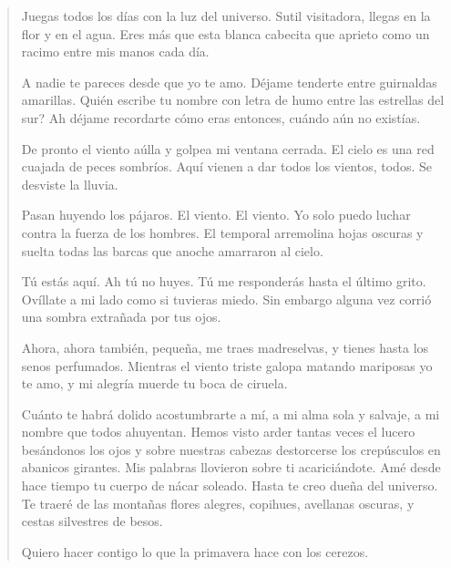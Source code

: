 \documentclass[12pt]{article}
\begin{document}
\clearpage
{}
\begin{verse}
Juegas todos los días con la luz del universo.  
Sutil visitadora, llegas en la flor y en el agua.  
Eres más que esta blanca cabecita que aprieto  
como un racimo entre mis manos cada día.  
	
A nadie te pareces desde que yo te amo.  
Déjame tenderte entre guirnaldas amarillas.  
Quién escribe tu nombre con letra de humo entre las estrellas del sur?  
Ah déjame recordarte cómo eras entonces, cuándo aún no existías.  
	
De pronto el viento aúlla y golpea mi ventana cerrada.  
El cielo es una red cuajada de peces sombríos.  
Aquí vienen a dar todos los vientos, todos.  
Se desviste la lluvia.  
	
Pasan huyendo los pájaros.  
El viento. El viento.  
Yo solo puedo luchar contra la fuerza de los hombres.  
El temporal arremolina hojas oscuras  
y suelta todas las barcas que anoche amarraron al cielo.  
	
Tú estás aquí. Ah tú no huyes.  
Tú me responderás hasta el último grito.  
Ovíllate a mi lado como si tuvieras miedo.  
Sin embargo alguna vez corrió una sombra extrañada por tus ojos.  
	
Ahora, ahora también, pequeña, me traes madreselvas,  
y tienes hasta los senos perfumados.  
Mientras el viento triste galopa matando mariposas  
yo te amo, y mi alegría muerde tu boca de ciruela.  
	
Cuánto te habrá dolido acostumbrarte a mí,  
a mi alma sola y salvaje, a mi nombre que todos ahuyentan.  
Hemos visto arder tantas veces el lucero besándonos los ojos  
y sobre nuestras cabezas destorcerse los crepúsculos en abanicos girantes.  
Mis palabras llovieron sobre ti acariciándote.  
Amé desde hace tiempo tu cuerpo de nácar soleado.  
Hasta te creo dueña del universo.  
Te traeré de las montañas flores alegres, copihues,  
avellanas oscuras, y cestas silvestres de besos.  
	
Quiero hacer contigo  
lo que la primavera hace con los cerezos.

\end{verse}
\end{document}
